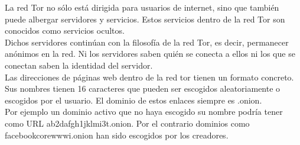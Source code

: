 La red Tor no sólo está dirigida para usuarios de internet, sino que también puede albergar servidores y servicios. Estos servicios dentro de la red Tor son conocidos como servicios ocultos.\\
Dichos servidores continúan con la filosofía de la red Tor, es decir, permanecer anónimos en la red. Ni los servidores saben quién se conecta a ellos ni los que se conectan saben la identidad del servidor.\\
Las direcciones de páginas web dentro de la red tor tienen un formato concreto. Sus nombres tienen 16 caracteres que pueden ser escogidos aleatoriamente o escogidos por el usuario. El dominio de estos enlaces siempre es .onion.\\
Por ejemplo un dominio activo que no haya escogido su nombre podría tener como URL ab2dafgh1jklmi3t.onion. Por el contrario dominios como facebookcorewwwi.onion han sido escogidos por los creadores.
